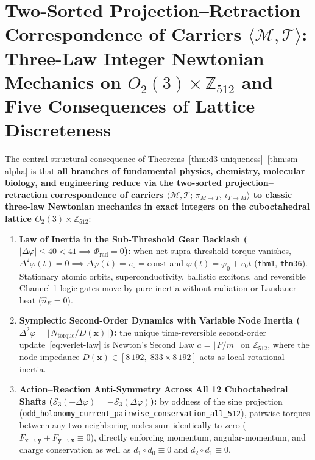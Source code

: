 \documentclass[11pt,a4paper]{article}
\theoremstyle{plain}
\theoremstyle{definition}
\begin{document}
\section{Two-Sorted Projection--Retraction Correspondence of Carriers \texorpdfstring{$\langle\mathcal{M},\mathcal{T}\rangle$}{<M,T>}: Three-Law Integer Newtonian Mechanics on \texorpdfstring{$O_2(3)\times\mathbb{Z}_{512}$}{O2(3) x Z512} and Five Consequences of Lattice Discreteness}
\label{sec:newtonian-homeomorphism}

The central structural consequence of Theorems~\ref{thm:d3-uniqueness}--\ref{thm:sm-alpha} is that \textbf{all branches of fundamental physics, chemistry, molecular biology, and engineering reduce via the two-sorted projection--retraction correspondence of carriers $\langle\mathcal{M},\mathcal{T};\,\pi_{M\to T},\,\iota_{T\to M}\rangle$ to classic three-law Newtonian mechanics in exact integers on the cuboctahedral lattice $O_2(3)\times\mathbb{Z}_{512}$}:
\begin{enumerate}[label=\textbf{Newton's Law \Roman*.},leftmargin=*]
\item \textbf{Law of Inertia in the Sub-Threshold Gear Backlash ($|\Delta\varphi|\le 40 < 41 \implies \Phi_{\mathrm{rad}} = 0$):}
  when net supra-threshold torque vanishes, $\Delta^2\varphi(t) = 0 \implies \Delta\varphi(t) = v_0 = \mathrm{const}$ and $\varphi(t) = \varphi_0 + v_0 t$ (\texttt{thm1}, \texttt{thm36}). Stationary atomic orbits, superconductivity, ballistic excitons, and reversible Channel-1 logic gates move by pure inertia without radiation or Landauer heat ($\hat{n}_E = 0$).
\item \textbf{Symplectic Second-Order Dynamics with Variable Node Inertia ($\Delta^2\varphi = \lfloor N_{\mathrm{torque}}/D(\mathbf{x})\rfloor$):}
  the unique time-reversible second-order update~\eqref{eq:verlet-law} is Newton's Second Law $a = \lfloor F/m\rfloor$ on $\mathbb{Z}_{512}$, where the node impedance $D(\mathbf{x})\in[8\,192,\; 833\times 8\,192]$ acts as local rotational inertia.
\item \textbf{Action--Reaction Anti-Symmetry Across All 12 Cuboctahedral Shafts ($\mathcal{S}_3(-\Delta\varphi) = -\mathcal{S}_3(\Delta\varphi)$):}
  by oddness of the sine projection (\texttt{odd\_holonomy\_current\_pairwise\_conservation\_all\_512}), pairwise torques between any two neighboring nodes sum identically to zero ($F_{\mathbf{x}\to\mathbf{y}} + F_{\mathbf{y}\to\mathbf{x}} \equiv 0$), directly enforcing momentum, angular-momentum, and charge conservation as well as $d_1\circ d_0 \equiv 0$ and $d_2\circ d_1 \equiv 0$.
\end{enumerate}
\end{document}
